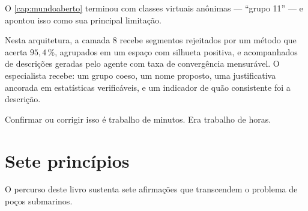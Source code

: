 \begin{destaque}
O \cref{cap:mundoaberto} terminou com classes virtuais anônimas --- ``grupo 11'' --- e
apontou isso como sua principal limitação.

Nesta arquitetura, a camada 8 recebe segmentos rejeitados por um método que acerta
$95{,}4\,\%$, agrupados em um espaço com silhueta positiva, e acompanhados de descrições
geradas pelo agente com taxa de convergência mensurável. O especialista recebe: um grupo
coeso, um nome proposto, uma justificativa ancorada em estatísticas verificáveis, e um
indicador de quão consistente foi a descrição.

Confirmar ou corrigir isso é trabalho de minutos. Era trabalho de horas.
\end{destaque}

\section{Sete princípios}

O percurso deste livro sustenta sete afirmações que transcendem o problema de poços
submarinos.


